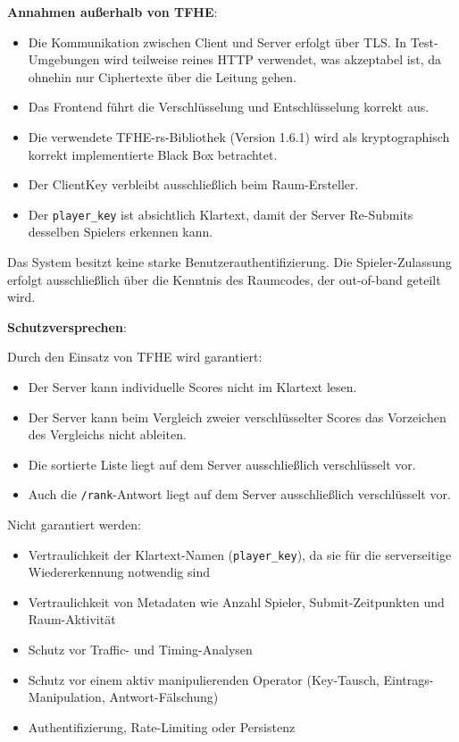 \textbf{Annahmen außerhalb von TFHE}:
\begin{itemize}
    \item Die Kommunikation zwischen Client und Server erfolgt über TLS. In Test-Umgebungen wird teilweise reines HTTP verwendet, was akzeptabel ist, da ohnehin nur Ciphertexte über die Leitung gehen.
    \item Das Frontend führt die Verschlüsselung und Entschlüsselung korrekt aus.
    \item Die verwendete TFHE-rs-Bibliothek (Version 1.6.1) wird als kryptographisch korrekt implementierte Black Box betrachtet.
    \item Der ClientKey verbleibt ausschließlich beim Raum-Ersteller.
    \item Der \texttt{player\_key} ist absichtlich Klartext, damit der Server Re-Submits desselben Spielers erkennen kann.
\end{itemize}

Das System besitzt keine starke Benutzerauthentifizierung. Die Spieler-Zulassung erfolgt ausschließlich über die Kenntnis des Raumcodes, der out-of-band geteilt wird.

\textbf{Schutzversprechen}:

Durch den Einsatz von TFHE wird garantiert:
\begin{itemize}
    \item Der Server kann individuelle Scores nicht im Klartext lesen.
    \item Der Server kann beim Vergleich zweier verschlüsselter Scores das Vorzeichen des Vergleichs nicht ableiten.
    \item Die sortierte Liste liegt auf dem Server ausschließlich verschlüsselt vor.
    \item Auch die \texttt{/rank}-Antwort liegt auf dem Server ausschließlich verschlüsselt vor.
\end{itemize}

Nicht garantiert werden:
\begin{itemize}
    \item Vertraulichkeit der Klartext-Namen (\texttt{player\_key}), da sie für die serverseitige Wiedererkennung notwendig sind
    \item Vertraulichkeit von Metadaten wie Anzahl Spieler, Submit-Zeitpunkten und Raum-Aktivität
    \item Schutz vor Traffic- und Timing-Analysen
    \item Schutz vor einem aktiv manipulierenden Operator (Key-Tausch, Eintrags-Manipulation, Antwort-Fälschung)
    \item Authentifizierung, Rate-Limiting oder Persistenz
\end{itemize}

